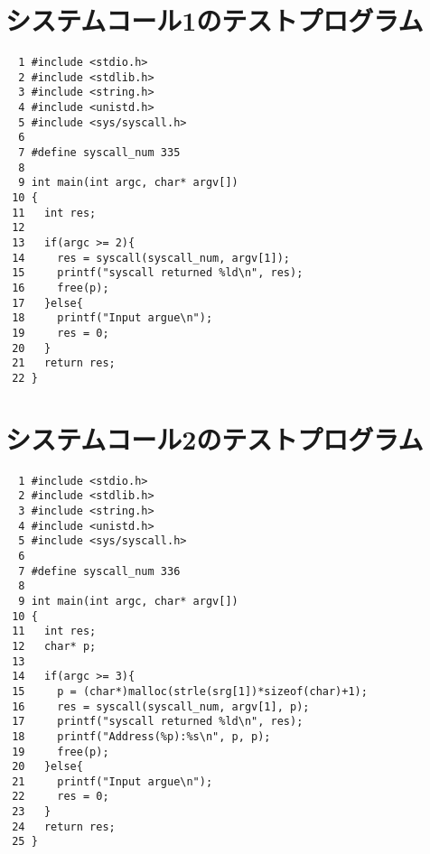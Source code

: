 \documentclass[12pt]{jsarticle}
\begin{document}
\section{システムコール1のテストプログラム}
\label{sec:D}
\begin{verbatim}
  1	#include <stdio.h>
  2	#include <stdlib.h>
  3	#include <string.h>
  4	#include <unistd.h>
  5	#include <sys/syscall.h>
  6	
  7	#define syscall_num 335
  8	
  9	int main(int argc, char* argv[])
 10	{
 11	  int res;
 12	
 13	  if(argc >= 2){
 14	    res = syscall(syscall_num, argv[1]);
 15	    printf("syscall returned %ld\n", res);
 16	    free(p);
 17	  }else{
 18	    printf("Input argue\n");
 19	    res = 0;
 20	  }
 21	  return res;
 22	}
\end{verbatim}

\section{システムコール2のテストプログラム}
\label{sec:E}
\begin{verbatim}
  1	#include <stdio.h>
  2	#include <stdlib.h>
  3	#include <string.h>
  4	#include <unistd.h>
  5	#include <sys/syscall.h>
  6	
  7	#define syscall_num 336
  8	
  9	int main(int argc, char* argv[])
 10	{
 11	  int res;
 12	  char* p;
 13	
 14	  if(argc >= 3){
 15	    p = (char*)malloc(strle(srg[1])*sizeof(char)+1);
 16	    res = syscall(syscall_num, argv[1], p);
 17	    printf("syscall returned %ld\n", res);
 18	    printf("Address(%p):%s\n", p, p);
 19	    free(p);
 20	  }else{
 21	    printf("Input argue\n");
 22	    res = 0;
 23	  }
 24	  return res;
 25	}
\end{verbatim}
\end{document}
